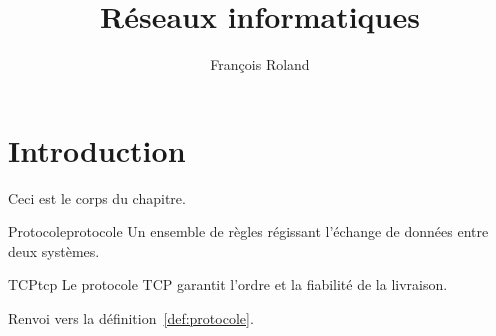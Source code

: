 \documentclass{heh-syllabus}
\title{Réseaux informatiques}
\author{François Roland}
\begin{document}
\frontmatter
\maketitle
\tableofcontents

\mainmatter
\chapter{Introduction}

Ceci est le corps du chapitre.

\begin{definition}{Protocole}{protocole}
  Un ensemble de règles régissant l'échange de données entre deux
  systèmes.
\end{definition}

\begin{exemple}{TCP}{tcp}
  Le protocole TCP garantit l'ordre et la fiabilité de la livraison.
\end{exemple}

Renvoi vers la définition~\ref{def:protocole}.

\end{document}
